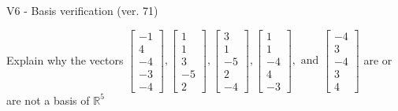 \begin{exercise}
  \begin{exerciseTitle}V6 - Basis verification (ver. 71)\end{exerciseTitle}
  \begin{exerciseStatement}
    Explain why the vectors \(\left[\begin{array}{r}
-1 \\
4 \\
-4 \\
-3 \\
-4
\end{array}\right] , \left[\begin{array}{r}
1 \\
1 \\
3 \\
-5 \\
2
\end{array}\right] , \left[\begin{array}{r}
3 \\
1 \\
-5 \\
2 \\
-4
\end{array}\right] , \left[\begin{array}{r}
1 \\
1 \\
-4 \\
4 \\
-3
\end{array}\right] , \text{ and } \left[\begin{array}{r}
-4 \\
3 \\
-4 \\
3 \\
4
\end{array}\right]\) are or are not a basis of \(\mathbb{R}^5\)	



\end{exerciseStatement}
\end{exercise}
